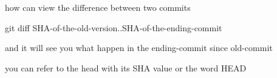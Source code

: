 how can view the difference between two commits 

git diff SHA-of-the-old-version..SHA-of-the-ending-commit 

and it will see you what happen in the ending-commit since old-commit 

you can refer to the head with its SHA value or the word HEAD 